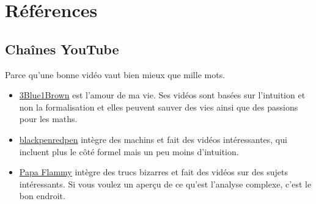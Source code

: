 \documentclass{article}
\begin{document}

\section{Références}

\subsection{Chaînes YouTube}
Parce qu'une bonne vidéo vaut bien mieux que mille mots.
\begin{itemize}
	\item \href{https://www.youtube.com/channel/UCYO_jab_esuFRV4b17AJtAw}{3Blue1Brown} est l'amour de ma vie. Ses vidéos sont basées sur l'intuition et non la formalisation et elles peuvent sauver des vies ainsi que des passions pour les maths.
	\item \href{https://www.youtube.com/user/blackpenredpen}{blackpenredpen} intègre des machins et fait des vidéos intéressantes, qui incluent plus le côté formel mais un peu moins d'intuition.
	\item \href{https://www.youtube.com/channel/UCtAIs1VCQrymlAnw3mGonhw}{Papa Flammy} intègre des trucs bizarres et fait des vidéos sur des sujets intéressants. Si vous voulez un aperçu de ce qu'est l'analyse complexe, c'est le bon endroit.
\end{itemize}
\end{document}
